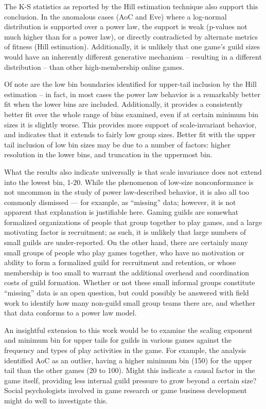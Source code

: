 \documentclass[pdftex,12pt]{llncs}
\begin{document}
The K-S statistics as reported by the Hill estimation technique also support this conclusion.
In the anomalous cases (AoC and Eve) where a log-normal distribution is supported over a power law, the support is weak (p-values not much higher than for a power law), or directly contradicted by alternate metrics of fitness (Hill estimation).
Additionally, it is unlikely that one game’s guild sizes would have an inherently different generative mechanism – resulting in a different distribution – than other high-membership online games.  

Of note are the low bin boundaries identified for upper-tail inclusion by the Hill estimation – in fact, in most cases the power law behavior is a remarkably better fit when the lower bins are included.
Additionally, it provides a consistently better fit over the whole range of bins examined, even if at certain minimum bin sizes it is slightly worse.
This provides more support of scale-invariant behavior, and indicates that it extends to fairly low group sizes.
Better fit with the upper tail inclusion of low bin sizes may be due to a number of factors:  higher resolution in the lower bins, and truncation in the uppermost bin. 

What the results also indicate universally is that scale invariance does not extend into the lowest bin, 1-20.
While the phenomenon of low-size nonconformance is not uncommon in the study of power law-described behavior, it is also all too commonly dismissed --- for example, as “missing” data; however, it is not apparent that explanation is justifiable here.
Gaming guilds are somewhat formalized organizations of people that group together to play games, and a large motivating factor is recruitment; as such, it is unlikely that large numbers of small guilds are under-reported.
On the other hand, there are certainly many small groups of people who play games together, who have no motivation or ability to form a formalized guild for recruitment and retention, or whose membership is too small to warrant the additional overhead and coordination costs of guild formation.
Whether or not these small informal groups constitute “missing” data is an open question, but could possibly be answered with field work to identify how many non-guild small group teams there are, and whether that data conforms to a power law model.

An insightful extension to this work would be to examine the scaling exponent and minimum bin for upper tails for guilds in various games against the frequency and types of play activities in the game.
For example, the analysis identified AoC as an outlier, having a higher minimum bin (150) for the upper tail than the other games (20 to 100).
Might this indicate a causal factor in the game itself, providing less internal guild pressure to grow beyond a certain size?
Social psychologists involved in game research or game business development might do well to investigate this.
\end{document}
